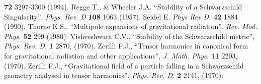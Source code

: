 \begin{thebibliography}{9}
                        {\bf 72} 
                        3297-3300 
                        (1994).
         Regge T., \& Wheeler J.A. 
                        ``Stability of a Schwarzschild Singularity'', 
                        {\em Phys. Rev. D} 
                        {\bf 108} 
                        1063 
                        (1957).
      Seidel E. 
                        {\em Phys Rev D.} 
                        {\bf 42} 
                        1884 
                        (1990).
      Thorne K.S., 
                        ``Multipole expansions of gravitational radiation'', 
                        {\em Rev. Mod. Phys.} 
                        {\bf 52} 
                        299 
                        (1980).
          Vishveshwara C.V., 
                        ``Stability of the Schwarzschild metric'',
                        {\em Phys. Rev. D.} 
                        {\bf 1} 
                        2870, 
                        (1970).
    Zerilli F.J., 
                        ``Tensor harmonics in canonical form for gravitational 
                          radiation and other applications'', 
                        {\em J. Math. Phys.} 
                        {\bf 11} 
                        2203, 
                        (1970).
     Zerilli F.J., 
                        ``Gravitational field of a particle falling 
                          in a Schwarzschild geometry analysed in 
                          tensor harmonics'',
                        {\em Phys. Rev. D.} 
                        {\bf 2} 
                        2141, 
                        (1970).
\end{thebibliography}



